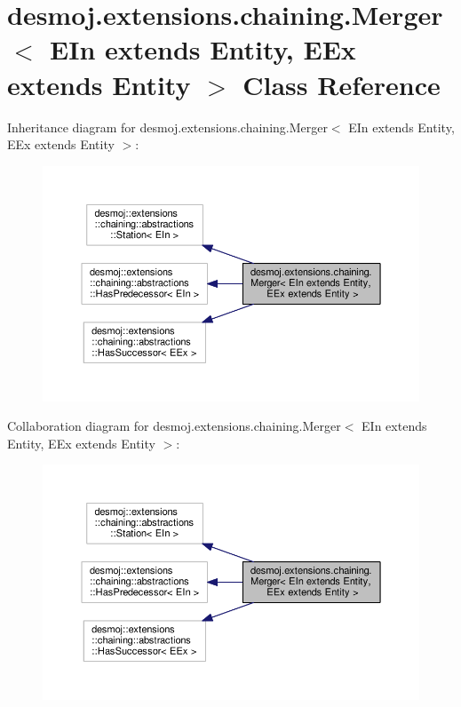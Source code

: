 \section{desmoj.\-extensions.\-chaining.\-Merger$<$ E\-In extends Entity, E\-Ex extends Entity $>$ Class Reference}
\label{classdesmoj_1_1extensions_1_1chaining_1_1_merger_3_01_e_in_01extends_01_entity_00_01_e_ex_01extends_01_entity_01_4}


Inheritance diagram for desmoj.\-extensions.\-chaining.\-Merger$<$ E\-In extends Entity, E\-Ex extends Entity $>$\-:
\nopagebreak
\begin{figure}[H]
\begin{center}
\leavevmode
\includegraphics[width=350pt]{classdesmoj_1_1extensions_1_1chaining_1_1_merger_3_01_e_in_01extends_01_entity_00_01_e_ex_01exte4cae3e8d1277f5ff122f19003acfde9c}
\end{center}
\end{figure}


Collaboration diagram for desmoj.\-extensions.\-chaining.\-Merger$<$ E\-In extends Entity, E\-Ex extends Entity $>$\-:
\nopagebreak
\begin{figure}[H]
\begin{center}
\leavevmode
\includegraphics[width=350pt]{classdesmoj_1_1extensions_1_1chaining_1_1_merger_3_01_e_in_01extends_01_entity_00_01_e_ex_01extends_01_entity_01_4__coll__graph}
\end{center}
\end{figure}
